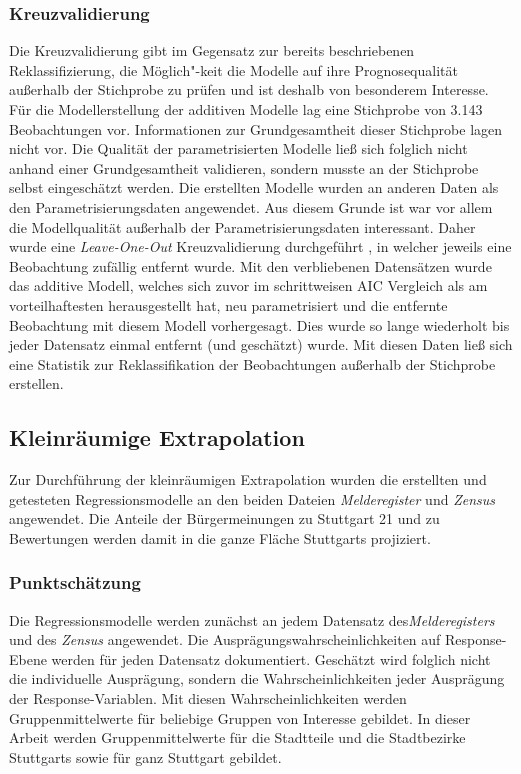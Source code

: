 \documentclass{Vorlage}
\begin{document}
\subsubsection{Kreuzvalidierung}
Die Kreuzvalidierung gibt im Gegensatz zur bereits beschriebenen Reklassifizierung, die Möglich"-keit die Modelle auf ihre Prognosequalität außerhalb der Stichprobe zu prüfen und ist deshalb von besonderem Interesse.
Für die Modellerstellung der additiven Modelle lag eine Stichprobe von 3.143 Beobachtungen vor. Informationen zur Grundgesamtheit dieser Stichprobe lagen nicht vor. Die Qualität der parametrisierten Modelle ließ sich folglich nicht anhand einer Grundgesamtheit validieren, sondern musste an der Stichprobe selbst eingeschätzt werden. Die erstellten Modelle wurden an anderen Daten als den Parametrisierungsdaten angewendet. Aus diesem Grunde ist war vor allem die Modellqualität außerhalb der Parametrisierungsdaten interessant. Daher wurde eine \textit{Leave-One-Out} Kreuzvalidierung durchgeführt \cite[p. 149]{fahrmeir2013regression}, in welcher jeweils eine Beobachtung zufällig entfernt wurde. Mit den verbliebenen Datensätzen wurde das additive Modell, welches sich zuvor im schrittweisen AIC Vergleich als am vorteilhaftesten herausgestellt hat, neu parametrisiert und die entfernte Beobachtung mit diesem Modell vorhergesagt. Dies wurde so lange wiederholt bis jeder Datensatz einmal entfernt (und geschätzt) wurde. Mit diesen Daten ließ sich eine Statistik zur Reklassifikation der Beobachtungen außerhalb der Stichprobe erstellen.

\newpage

\subsection{Kleinräumige Extrapolation}
Zur Durchführung der kleinräumigen Extrapolation wurden die erstellten und getesteten Regressionsmodelle an den beiden Dateien \textit{Melderegister} und \textit{Zensus} angewendet. Die Anteile der Bürgermeinungen zu Stuttgart 21 und zu Bewertungen werden damit in die ganze Fläche Stuttgarts projiziert.

\subsubsection{Punktschätzung}
Die Regressionsmodelle werden zunächst an jedem Datensatz des\textit{Melderegisters} und des \textit{Zensus} angewendet. Die Ausprägungswahrscheinlichkeiten auf Response-Ebene werden für jeden Datensatz dokumentiert. Geschätzt wird folglich nicht die individuelle Ausprägung, sondern die Wahrscheinlichkeiten jeder Ausprägung der Response-Variablen. Mit diesen Wahrscheinlichkeiten werden Gruppenmittelwerte für beliebige Gruppen von Interesse gebildet. In dieser Arbeit werden Gruppenmittelwerte für die Stadtteile und die Stadtbezirke Stuttgarts sowie für ganz Stuttgart gebildet.
\end{document}
